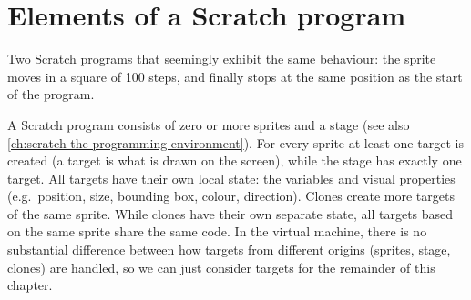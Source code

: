 \documentclass[../main]{subfiles}
\begin{document}
\section{Elements of a Scratch program}\label{sec:elements-of-a-scratch-program}

\begin{listing}
    \centering
    \begin{sublisting}{0.45\textwidth}
        \centering
        \begin{scratch}[scale=0.7]
        \end{scratch}
    \end{sublisting}
    \begin{sublisting}{0.45\textwidth}
        \centering
        \begin{scratch}[scale=0.7]
        \end{scratch}
    \end{sublisting}
    \caption{
        Two Scratch programs that seemingly exhibit the same behaviour: the sprite moves in a square of 100 steps, and finally stops at the same position as the start of the program.
    }
    \label{lst:scratch-two-programs}
\end{listing}

A Scratch program consists of zero or more sprites and a stage (see also \cref{ch:scratch-the-programming-environment}).
For every sprite at least one target is created (a target is what is drawn on the screen), while the stage has exactly one target.
All targets have their own local state: the variables and visual properties (e.g.\ position, size, bounding box, colour, direction).
Clones create more targets of the same sprite.
While clones have their own separate state, all targets based on the same sprite share the same code.
In the virtual machine, there is no substantial difference between how targets from different origins (sprites, stage, clones) are handled, so we can just consider targets for the remainder of this chapter.
\end{document}
